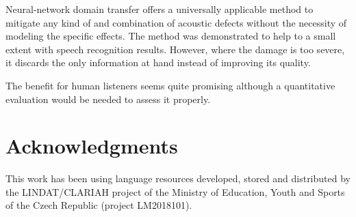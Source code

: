 \documentclass[runningheads,a4paper]{llncs}
\begin{document}
Neural-network domain transfer offers a universally applicable method to
mitigate any kind of and combination of acoustic defects without the necessity
of modeling the specific effects.
The method was demonstrated to help to a small extent with speech recognition
results. However, where the damage is too severe, it discards the only
information at hand instead of improving its quality.

The benefit for human listeners seems quite promising although a quantitative
evaluation would be needed to assess it properly.

\section*{Acknowledgments}

This work has been using language resources developed, stored and distributed by
the LINDAT/CLARIAH project of the Ministry of Education, Youth and Sports of the
Czech Republic (project LM2018101).




\end{document}
